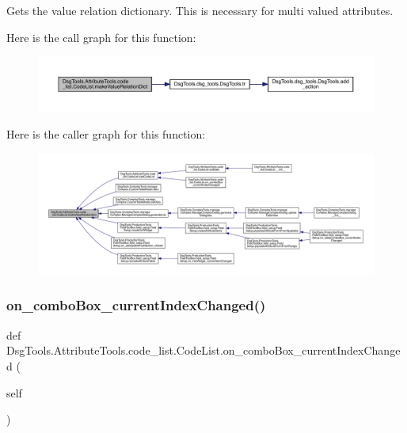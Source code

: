 \begin{DoxyVerb}Gets the value relation dictionary. This is necessary for multi valued attributes.
\end{DoxyVerb}
 Here is the call graph for this function\+:
\nopagebreak
\begin{figure}[H]
\begin{center}
\leavevmode
\includegraphics[width=350pt]{class_dsg_tools_1_1_attribute_tools_1_1code__list_1_1_code_list_aa6d24b65dfba750135e6f85d7c47e431_cgraph}
\end{center}
\end{figure}
Here is the caller graph for this function\+:
\nopagebreak
\begin{figure}[H]
\begin{center}
\leavevmode
\includegraphics[width=350pt]{class_dsg_tools_1_1_attribute_tools_1_1code__list_1_1_code_list_aa6d24b65dfba750135e6f85d7c47e431_icgraph}
\end{center}
\end{figure}
\mbox{\label{class_dsg_tools_1_1_attribute_tools_1_1code__list_1_1_code_list_aaa550bd981e4c040fa9b8cd7d44671b1}} 
\subsubsection{\texorpdfstring{on\+\_\+combo\+Box\+\_\+current\+Index\+Changed()}{on\_comboBox\_currentIndexChanged()}}
{\footnotesize\ttfamily def Dsg\+Tools.\+Attribute\+Tools.\+code\+\_\+list.\+Code\+List.\+on\+\_\+combo\+Box\+\_\+current\+Index\+Changed (\begin{DoxyParamCaption}\item[{}]{self }\end{DoxyParamCaption})}

